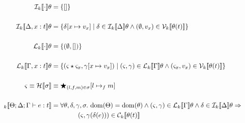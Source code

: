 \begin{align*}
\\
    \den{I}{k}{ \cdot } \theta &= \{ [] \} \\
\\
    \den{I}{k}{ \Delta, x : t } \theta &= \{ \delta[x \mapsto v_x ] \mid \delta \in \den{I}{k}{\Delta}\theta \wedge (\empH, v_x) \in \V{k}{\theta(t)} \} \\
\\
    \den{L}{k}{ \cdot } \theta &= \{ (\empH, []) \} \\
\\
    \den{L}{k}{ \Gamma, x : t } \theta &= \{ (\varsigma \star \varsigma_x, \gamma[x \mapsto v_x ]) \mid (\varsigma, \gamma) \in \den{L}{k}{\Gamma}\theta \wedge (\varsigma_x, v_x) \in \V{k}{\theta(t)} \} \\
\\
    \varsigma \equiv \den{H}{}{\sigma} &\equiv \bigstar_{(l,f,m) \in \sigma} [ l \mapsto_f m ]\\
\\
\den{}{k}{ \Theta; \Delta ; \Gamma \vdash e : t } &= \forall \theta, \delta, \gamma, \sigma.\ \dom(\Theta) = \dom(\theta) \wedge (\varsigma, \gamma) \in \den{L}{k}{ \Gamma }\theta \wedge \delta \in \den{I}{k}{ \Delta }\theta \Rightarrow \\
                                                 & \qquad \qquad (\varsigma, \gamma(\delta(e))) \in \C{k}{ \theta(t) }
\end{align*}
